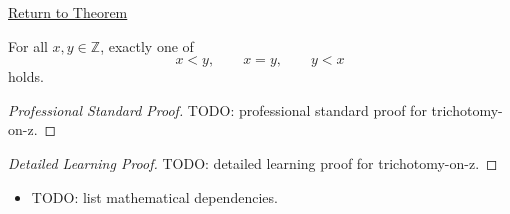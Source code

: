 \newpage
{}
\label{prf:trichotomy-on-z}

\begin{remark*}[Return]
\hyperref[thm:trichotomy-on-z]{Return to Theorem}
\end{remark*}

\begin{theorem*}[Trichotomy on $Z$]
For all $x,y\in\mathbb{Z}$, exactly one of
\[
x<y,\qquad x=y,\qquad y<x
\]
holds.
\end{theorem*}

\begin{proof}[Professional Standard Proof]
\LRAProofBodyStart
TODO: professional standard proof for trichotomy-on-z.
\end{proof}

\begin{proof}[Detailed Learning Proof]
\LRAProofBodyStart
TODO: detailed learning proof for trichotomy-on-z.
\end{proof}

\begin{remark*}
\end{remark*}

\begin{dependencies}
\begin{itemize}
  \item TODO: list mathematical dependencies.
\end{itemize}
\end{dependencies}

\clearpage

